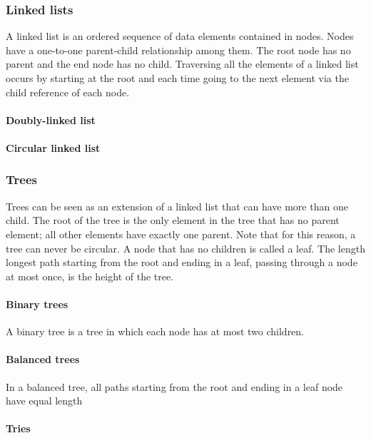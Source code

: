\subsubsection{Linked lists}

A linked list is an ordered sequence of data elements contained in nodes. Nodes have a one-to-one parent-child relationship among them. The root node has no parent and the end node has no child. Traversing all the elements of a linked list occurs by starting at the root and each time going to the next element via the child reference of each node.




\paragraph{Doubly-linked list}


\paragraph{Circular linked list}




\subsubsection{Trees}

Trees can be seen as an extension of a linked list that can have more than one child. The root of the tree is the only element in the tree that has no parent element; all other elements have exactly one parent. Note that for this reason, a tree can never be circular. A node that has no children is called a leaf. The length longest path starting from the root and ending in a leaf, passing through a node at most once, is the height of the tree.


\paragraph{Binary trees}

A binary tree is a tree in which each node has at most two children.


\paragraph{Balanced trees}

In a balanced tree, all paths starting from the root and ending in a leaf node have equal length


\paragraph{Tries}

